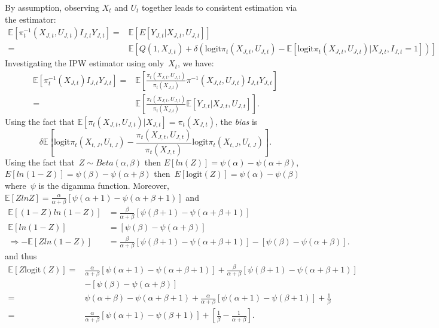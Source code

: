 \documentclass[12pt]{amsart}
\numberwithin{equation}{section}
\theoremstyle{plain}
\def\logit{\text{logit}}
\def\EE{\mathbb{E}}
\begin{document}
 By assumption, observing $X_t$ and $U_t$ together leads to consistent estimation via the estimator:
\begin{align*}
\EE\left[\pi^{-1}_t (X_{J,t}, U_{J,t}) I_{J,t} Y_{J,t} \right]
= &\EE[ E[ Y_{J,t} | X_{J,t}, U_{J,t}] ] \\
= &\EE \left[ Q(1,X_{J,t}) + \delta \left( \logit \pi_t (X_{J,t}, U_{J,t}) - \EE \left[ \logit \pi_t (X_{J,t}, U_{J,t}) | X_{J,t}, I_{J,t} = 1 \right] \right) \right]
\end{align*}
 Investigating the IPW estimator using only~$X_t$, we have:
\begin{align*}
\EE\left[\pi^{-1}_t (X_{J,t}) I_{J,t} Y_{J,t} \right]
=&\EE\left[\frac{\pi_t (X_{J,t}, U_{J,t})}{\pi_t (X_{J,t})} \pi^{-1} (X_{J,t}, U_{J,t}) I_{J,t} Y_{J,t} \right] \\
= &\EE\left[ \frac{\pi_t (X_{J,t}, U_{J,t})}{\pi_t (X_{J,t})} \EE[ Y_{J,t} | X_{J,t}, U_{J,t}] \right].
\end{align*}
Using the fact that $\EE \left[ \pi_t (X_{J,t}, U_{J,t}) | X_{J,t} \right] = \pi_{t} (X_{J,t})$, the \emph{bias} is
$$
\delta \EE \left[ \logit \pi_t (X_{t,J}, U_{t,J}) - \frac{\pi_t (X_{J,t}, U_{J,t})}{\pi_t (X_{J,t})} \logit \pi_t (X_{t,J}, U_{t,J}) \right].
$$
Using the fact that~$Z \sim Beta(\alpha, \beta)$ then $E[ ln(Z) ] = \psi(\alpha) - \psi(\alpha + \beta)$, $E[ ln(1-Z) ] = \psi(\beta) - \psi(\alpha + \beta)$ then~$E[ \logit (Z) ] = \psi(\alpha) - \psi(\beta)$ where~$\psi$ is the digamma function.  Moreover,~$\EE[ Z ln Z ] = \frac{\alpha}{\alpha + \beta} \left[ \psi(\alpha + 1) - \psi(\alpha + \beta +1) \right]$ and
\begin{align*}
\EE \left[ (1-Z) ln(1-Z) \right] &= \frac{\beta}{\alpha + \beta} \left[ \psi(\beta + 1) - \psi(\alpha + \beta +1) \right] \\
\EE \left[ ln(1-Z) \right] &= \left[ \psi(\beta) - \psi(\alpha + \beta) \right] \\
\Rightarrow - \EE \left[ Z ln(1-Z) \right] &= \frac{\beta}{\alpha + \beta} \left[ \psi(\beta + 1) - \psi(\alpha + \beta +1) \right] - \left[ \psi(\beta) - \psi(\alpha + \beta) \right].
\end{align*}
and thus
\begin{align*}
\EE \left[ Z \logit(Z) \right] =& \frac{\alpha}{\alpha + \beta} \left[ \psi(\alpha + 1) - \psi(\alpha + \beta +1) \right] + \frac{\beta}{\alpha + \beta} \left[ \psi(\beta + 1) - \psi(\alpha + \beta +1) \right] \\
&- \left[ \psi(\beta) - \psi(\alpha + \beta) \right] \\
=& \psi(\alpha + \beta) - \psi(\alpha + \beta +1) + \frac{\alpha}{\alpha + \beta} \left[ \psi(\alpha + 1) - \psi(\beta+1) \right] + \frac{1}{\beta} \\
=& \frac{\alpha}{\alpha + \beta} \left[ \psi(\alpha + 1) - \psi(\beta+1) \right] + \left[ \frac{1}{\beta} - \frac{1}{\alpha + \beta} \right].
\end{align*}
\end{document}
